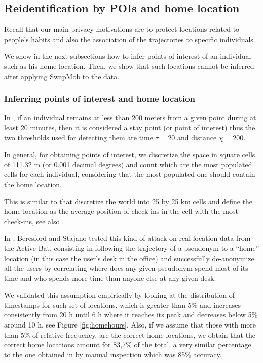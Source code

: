 \documentclass{llncs}
\begin{document}
\subsection{Reidentification by POIs and home location}
Recall that our main privacy motivations are to protect locations related to people's habits and also the association of the trajectories to specific individuals.

We show in the next subsections how to infer points of interest of an individual such as his home location. Then, we show that such locations cannot be inferred after applying SwapMob to the data. 



\subsubsection{Inferring points of interest and home location}
In \cite{Zheng2009}, if an individual remains at less than 200 meters from a given point during at least 20 minutes, then it is considered a stay point (or point of interest) thus the two thresholds used for detecting them are time $\tau = 20$ and distance $\chi = 200$. 

In general, for obtaining points of interest, we discretize the space in square cells of 111.32 m (or 0.001 decimal degrees) and count which are the most populated cells for each individual, considering that the most populated one should contain the home location. 

This is similar to \cite{Cho2011} that discretize the world into 25 by 25 km cells and define the home location as the average position of check-ins in the cell with the most check-ins, see also \cite{scellato2011sociospatial}.

In \cite{Beresford2003}, Beresford and Stajano tested this kind of attack on real location data from the Active Bat, consisting in following the trajectory of a pseudonym to a ``home'' location (in this case the user's desk in the office) and successfully de-anonymize all the users by correlating  where does any given pseudonym spend most of its time and who spends more time than anyone else at any given desk.


We validated this assumption empirically by looking at the distribution of timestamps for such set of locations, which is greater than 5\% and increases consistently from 20 h until 6 h where it reaches its peak and decreases below 5\% around 10 h, see Figure \ref{fig:homehours}.
Also, if we assume that those with more than 5\% of relative frequency, are the correct home locations, we obtain that the correct home locations amount for 83,7\% of the total, a very similar percentage to the one obtained in \cite{Cho2011} 
by manual inspection which was 85\% accuracy.
\end{document}
